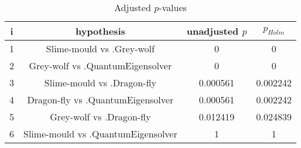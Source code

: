 \documentclass[a4paper,10pt]{article}
\begin{document}
\begin{landscape}
\begin{table}[!htp]
\centering\scriptsize
\begin{tabular}{cccc}
i&hypothesis&unadjusted $p$&$p_{Holm}$\\
\hline1&Slime-mould vs .Grey-wolf&0&0\\
2&Grey-wolf vs .QuantumEigensolver&0&0\\
3&Slime-mould vs .Dragon-fly&0.000561&0.002242\\
4&Dragon-fly vs .QuantumEigensolver&0.000561&0.002242\\
5&Grey-wolf vs .Dragon-fly&0.012419&0.024839\\
6&Slime-mould vs .QuantumEigensolver&1&1\\
\hline
\end{tabular}
\caption{Adjusted $p$-values}
\end{table}

\end{landscape}
\end{document}
